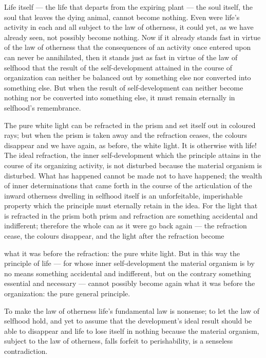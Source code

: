 \documentclass[12pt,a4paper]{book}
\begin{document}
Life itself --- the life that departs from the expiring plant --- the soul itself,
the soul that leaves the dying animal, cannot become nothing. Even were life's
activity in each and all subject to the law of otherness, it could yet, as we have
already seen, not possibly become nothing. Now if it already stands fast in virtue
of the law of otherness that the consequences of an activity once entered upon can
never be annihilated, then it stands just as fast in virtue of the law of selfhood
that the result of the self-development attained in the course of organization can
neither be balanced out by something else nor converted into something else. But
when the result of self-development can neither become nothing nor be converted
into something else, it must remain eternally in selfhood's remembrance.

The pure white light can be refracted in the prism and set itself out in coloured
rays; but when the prism is taken away and the refraction ceases, the colours
disappear and we have again, as before, the white light. It is otherwise with
life! The ideal refraction, the inner self-development which the principle attains
in the course of its organizing activity, is not disturbed because the material
organism is disturbed. What has happened cannot be made not to have happened; the
wealth of inner determinations that came forth in the course of the articulation
of the inward otherness dwelling in selfhood itself is an unforfeitable,
imperishable property which the principle must eternally retain in the idea. For
the light that is refracted in the prism both prism and refraction are something
accidental and indifferent; therefore the whole can as it were go back again ---
the refraction cease, the colours disappear, and the light after the refraction
become

what it was before the refraction: the pure white light. But in this way the
principle of life --- for whose inner self-development the material organism is by
no means something accidental and indifferent, but on the contrary something
essential and necessary --- cannot possibly become again what it was before the
organization: the pure general principle.

To make the law of otherness life's fundamental law is nonsense; to let the law of
selfhood hold, and yet to assume that the development's ideal result should be
able to disappear and life to lose itself in nothing because the material
organism, subject to the law of otherness, falls forfeit to perishability, is a
senseless contradiction.
\end{document}
